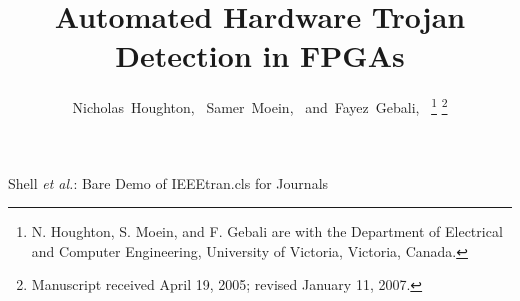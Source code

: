 \documentclass[journal, hidelinks]{IEEEtran}
\begin{document}
\DeclarePairedDelimiter\ceil{\lceil}{\rceil}
\DeclarePairedDelimiter\floor{\lfloor}{\rfloor}
%
\title{Automated Hardware Trojan Detection in FPGAs}
%
%
%

\author{Nicholas~Houghton,~
        Samer~Moein,~
        and~Fayez~Gebali,~%
\thanks{N. Houghton, S. Moein, and F. Gebali are with the Department
of Electrical and Computer Engineering, University of Victoria, Victoria, Canada.}
\thanks{Manuscript received April 19, 2005; revised January 11, 2007.}}

% 
%



%
{Shell \MakeLowercase{\textit{et al.}}: Bare Demo of IEEEtran.cls for Journals}
% 
\end{document}
